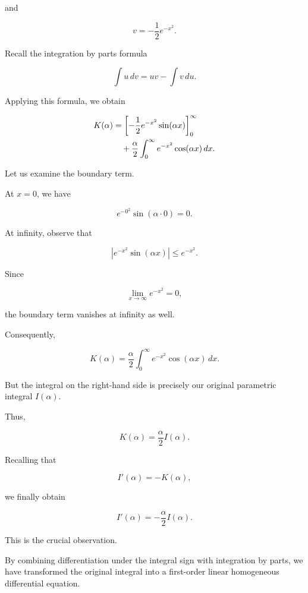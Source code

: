 \documentclass[11pt,a4paper]{article}
\theoremstyle{definition}
\theoremstyle{remark}
\begin{document}
and

\[
    v=-\frac12 e^{-x^2}.
\]

Recall the integration
by parts formula

\[
    \int u\,dv
    =
    uv-\int v\,du.
\]

Applying this formula,
we obtain

\begin{align}
    K(\alpha)
    &=
    \left[
    -\frac12 e^{-x^2}
    \sin(\alpha x)
    \right]_0^\infty
    \notag\\
    &\quad+
    \frac{\alpha}{2}
    \int_0^\infty
    e^{-x^2}\cos(\alpha x)\,dx.
    \label{eq:cauchy_ibp}
\end{align}

Let us examine the boundary term.

At $x=0$, we have

\[
    e^{-0^2}\sin(\alpha\cdot0)=0.
\]

At infinity, observe that

\[
    \left|
    e^{-x^2}\sin(\alpha x)
    \right|
    \leq e^{-x^2}.
\]

Since

\[
    \lim_{x\to\infty}e^{-x^2}=0,
\]

the boundary term vanishes
at infinity as well.

Consequently,

\begin{equation}
    K(\alpha)
    =
    \frac{\alpha}{2}
    \int_0^\infty
    e^{-x^2}\cos(\alpha x)\,dx.
\end{equation}

But the integral on the
right-hand side is precisely
our original parametric integral
$I(\alpha)$.

Thus,

\begin{equation}
    K(\alpha)
    =
    \frac{\alpha}{2}I(\alpha).
\end{equation}

Recalling that

\[
    I'(\alpha)=-K(\alpha),
\]

we finally obtain

\begin{equation}
    \boxed{
    I'(\alpha)
    =
    -\frac{\alpha}{2}I(\alpha).
    }
    \label{eq:cauchy_ode}
\end{equation}

This is the crucial
observation.

By combining differentiation
under the integral sign
with integration by parts,
we have transformed the
original integral into a
first-order linear
homogeneous differential
equation.
\end{document}
